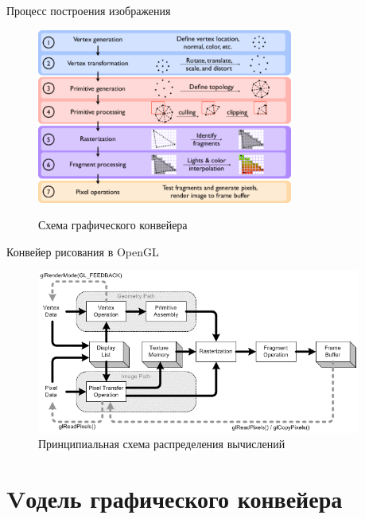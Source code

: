 \documentclass{beamer}
\begin{document}
\begin{frame}{Процесс построения изображения}
	\begin{figure}
		\href{https://www.researchgate.net/figure/Outline-of-the-graphics-pipeline_fig1_281810652}{
			\includegraphics[width=0.75\textwidth]{images/Outline-of-the-graphics-pipeline.png}}
		\caption{Схема графического конвейера}
	\end{figure}
\end{frame}

\begin{frame}{Конвейер рисования в OpenGL}{}
	\begin{figure}
		\includegraphics[width=0.95\textwidth]{images/OpenGL_graphics_pipeline.png}
		\caption {Принципиальная схема распределения вычислений}
	\end{figure}
\end{frame}

\section{Vодель графического конвейера}
\end{document}

